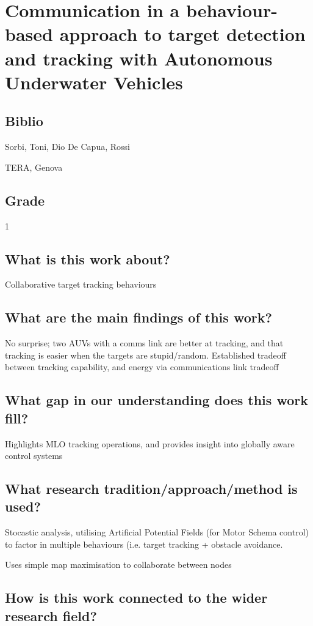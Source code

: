 \documentclass[a4paper]{report}
\begin{document}
\section{ Communication in a behaviour-based approach to target detection and tracking with Autonomous Underwater Vehicles \cite{Sorbi2010}}
\subsection{Biblio}
Sorbi, Toni, Dio De Capua, Rossi

TERA, Genova

\subsection{Grade}
1

\subsection{What is this work about?}
Collaborative target tracking behaviours
\subsection{What are the main findings of this work?}
No surprise; two AUVs with a comms link are better at tracking, and that tracking is easier when the targets are stupid/random.
Established tradeoff between tracking capability, and energy via communications link tradeoff
\subsection{What gap in our understanding does this work fill?}
Highlights MLO tracking operations, and provides insight into globally aware control systems
\subsection{What research tradition/approach/method is used?}
Stocastic analysis, utilising Artificial Potential Fields (for Motor Schema control) to factor in multiple behaviours (i.e. target tracking + obstacle avoidance.

Uses simple map maximisation to collaborate between nodes

\subsection{How is this work connected to the wider research field?}
\end{document}
